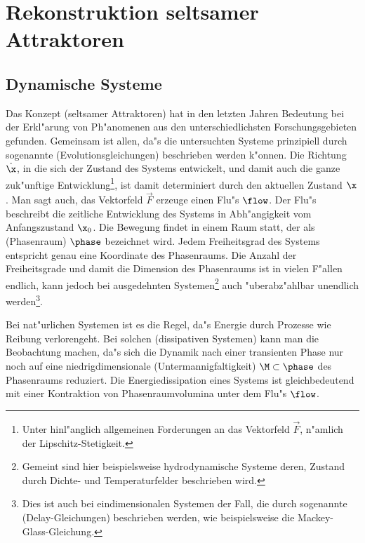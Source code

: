 \clearpage
\chapter{Rekonstruktion seltsamer Attraktoren}



\section{Dynamische Systeme}
\label{chapdynsystems}
Das Konzept \begriff(seltsamer Attraktoren) hat in den letzten Jahren Bedeutung bei der
Erkl"arung von Ph"anomenen aus den unterschiedlichsten Forschungsgebieten gefunden. Gemeinsam
ist allen, da"s die untersuchten Systeme prinzipiell durch sogenannte
\begriff(Evolutionsgleichungen)
beschrieben werden k"onnen. Die Richtung $\dot\x$, in die sich der Zustand des Systems entwickelt, und damit
auch die ganze zuk"unftige Entwicklung\footnote{Unter hinl"anglich allgemeinen Forderungen
an das Vektorfeld $\vec F$, n"amlich der Lipschitz-Stetigkeit.}, ist damit determiniert durch
den aktuellen Zustand $\x$. Man sagt auch, das Vektorfeld $\vec F$ erzeuge einen Flu"s
$\flow$.
Der Flu"s beschreibt die zeitliche Entwicklung des Systems in Abh"angigkeit vom
Anfangszustand $\x_0$.
Die Bewegung findet in einem Raum statt, der als \begriff(Phasenraum) $\phase$
bezeichnet wird. Jedem  Freiheitsgrad des Systems entspricht genau eine Koordinate des
Phasenraums. Die Anzahl der Freiheitsgrade und damit die Dimension des Phasenraums ist in
vielen F"allen endlich, kann jedoch bei ausgedehnten Systemen\footnote{Gemeint sind hier
  beispielsweise hydrodynamische Systeme deren, 
  Zustand durch Dichte- und Temperaturfelder beschrieben wird.} auch "uberabz"ahlbar
unendlich werden\footnote{Dies ist auch bei eindimensionalen Systemen der Fall, die durch
sogenannte \begriff(Delay-Gleichungen) beschrieben werden, wie beispielsweise die
Mackey-Glass-Gleichung. }.


Bei nat"urlichen Systemen ist es die Regel, da"s Energie durch Prozesse wie Reibung
verlorengeht. Bei solchen \begriff(dissipativen Systemen) kann man die Beobachtung
machen, da"s sich die Dynamik nach einer transienten Phase nur noch auf eine 
niedrigdimensionale \begriff(Untermannigfaltigkeit) $\M\subset\phase$ des Phasenraums
reduziert. Die Energiedissipation eines Systems ist gleichbedeutend mit einer Kontraktion
von Phasenraumvolumina unter dem Flu"s $\flow$.

